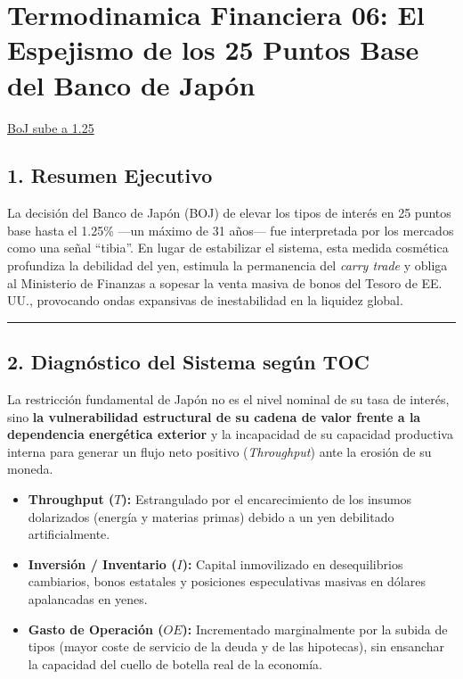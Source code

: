 \documentclass[12pt,letterpaper]{article}
\providecommand{\tightlist}{%
  \setlength{\itemsep}{0pt}\setlength{\parskip}{0pt}}
\begin{document}
\hypertarget{termodinamica-financiera-06-el-espejismo-de-los-25-puntos-base-del-banco-de-japuxf3n}{%
\section{Termodinamica Financiera 06: El Espejismo de los 25 Puntos Base
del Banco de
Japón}\label{termodinamica-financiera-06-el-espejismo-de-los-25-puntos-base-del-banco-de-japuxf3n}}

\href{https://www.reuters.com/world/asia-pacific/view-investors-react-boj-raising-interest-rates-31-year-high-2026-09-18/}{BoJ
sube a 1.25}

\hypertarget{resumen-ejecutivo}{%
\subsection{1. Resumen Ejecutivo}\label{resumen-ejecutivo}}

La decisión del Banco de Japón (BOJ) de elevar los tipos de interés en
25 puntos base hasta el 1.25\% ---un máximo de 31 años--- fue
interpretada por los mercados como una señal ``tibia''. En lugar de
estabilizar el sistema, esta medida cosmética profundiza la debilidad
del yen, estimula la permanencia del \emph{carry trade} y obliga al
Ministerio de Finanzas a sopesar la venta masiva de bonos del Tesoro de
EE. UU., provocando ondas expansivas de inestabilidad en la liquidez
global.

\begin{center}\rule{0.5\linewidth}{0.5pt}\end{center}

\hypertarget{diagnuxf3stico-del-sistema-seguxfan-toc}{%
\subsection{2. Diagnóstico del Sistema según
TOC}\label{diagnuxf3stico-del-sistema-seguxfan-toc}}

La restricción fundamental de Japón no es el nivel nominal de su tasa de
interés, sino \textbf{la vulnerabilidad estructural de su cadena de
valor frente a la dependencia energética exterior} y la incapacidad de
su capacidad productiva interna para generar un flujo neto positivo
(\emph{Throughput}) ante la erosión de su moneda.

\begin{itemize}
\tightlist
\item
  \textbf{Throughput (\(T\)):} Estrangulado por el encarecimiento de los
  insumos dolarizados (energía y materias primas) debido a un yen
  debilitado artificialmente.
\item
  \textbf{Inversión / Inventario (\(I\)):} Capital inmovilizado en
  desequilibrios cambiarios, bonos estatales y posiciones especulativas
  masivas en dólares apalancadas en yenes.
\item
  \textbf{Gasto de Operación (\(OE\)):} Incrementado marginalmente por
  la subida de tipos (mayor coste de servicio de la deuda y de las
  hipotecas), sin ensanchar la capacidad del cuello de botella real de
  la economía.
\end{itemize}
\end{document}
